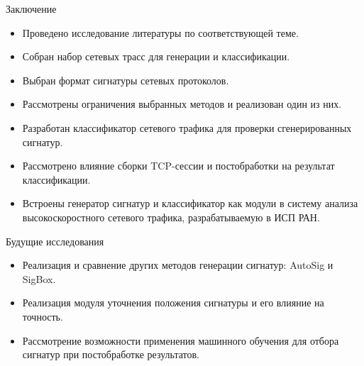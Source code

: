 \documentclass[10pt]{beamer}
\begin{document}
\begin{frame}{Заключение}
    \begin{itemize}
        \item Проведено исследование литературы по соответствующей теме.
        \item Собран набор сетевых трасс для генерации и классификации.
        \item Выбран формат сигнатуры сетевых протоколов.
        \item Рассмотрены ограничения выбранных методов и реализован один из них.
        \item Разработан классификатор сетевого трафика для проверки сгенерированных сигнатур.
        \item Рассмотрено влияние сборки TCP-сессии и постобработки на результат классификации.
        \item Встроены генератор сигнатур и классификатор как модули в систему анализа высокоскоростного сетевого трафика, разрабатываемую в ИСП РАН.
    \end{itemize}
\end{frame}

\begin{frame}{Будущие исследования}
    \begin{itemize}
        \item Реализация и сравнение других методов генерации сигнатур: AutoSig и SigBox.
        \item Реализация модуля уточнения положения сигнатуры и его влияние на точность.
        \item Рассмотрение возможности применения машинного обучения для отбора сигнатур при постобработке результатов.
    \end{itemize}
\end{frame}

\appendix
\end{document}
